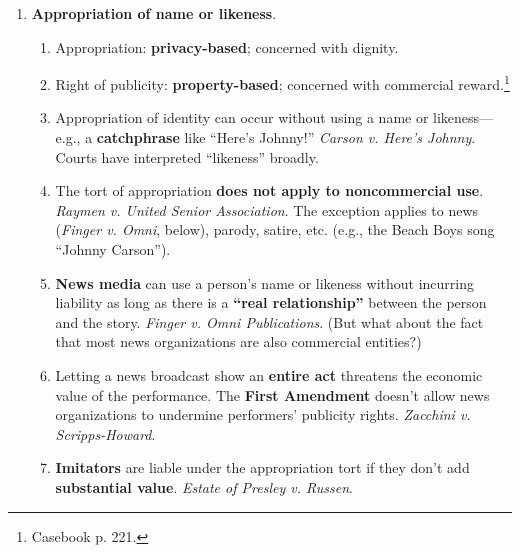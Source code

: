 \begin{enumerate}
\begin{enumerate}
        \begin{enumerate}
            \item Liability arises when ``\textbf{extreme and outrageous 
            conduct intentionally or recklessly} causes severe emotional 
            distress.''\footnote{Casebook p. 211.}
            \item To claim intentional infliction of emotional distress from 
            published material, public figures and officials must also show 
            \emph{New York Times} malice. \emph{Hustler v. Falwell}.
            \item There is \textbf{special protection} for public speech on 
            matters of \textbf{public concern}. \emph{Snyder v. Phelps} 
            (Westboro Baptist).
        \end{enumerate}
    \end{enumerate}
    \item \textbf{Appropriation of name or likeness}.
    \begin{enumerate}
        \item Appropriation: \textbf{privacy-based}; concerned with dignity.
        \item Right of publicity: \textbf{property-based}; concerned with 
        commercial reward.\footnote{Casebook p. 221.}
        \item Appropriation of identity can occur without using a name or 
        likeness---e.g., a \textbf{catchphrase} like ``Here's Johnny!'' 
        \emph{Carson v. Here's Johnny}. Courts have interpreted ``likeness'' 
        broadly.
        \item The tort of appropriation \textbf{does not apply to 
        noncommercial use}. \emph{Raymen v. United Senior Association}. The 
        exception applies to news (\emph{Finger v.  Omni}, below), parody, 
        satire, etc. (e.g., the Beach Boys song ``Johnny Carson'').
        \item \textbf{News media} can use a person's name or likeness without 
        incurring liability as long as there is a \textbf{``real 
        relationship''} between the person and the story. \emph{Finger v. Omni 
        Publications}. (But what about the fact that most news organizations 
        are also commercial entities?)
        \item Letting a news broadcast show an \textbf{entire act} threatens 
        the economic value of the performance. The \textbf{First Amendment} 
        doesn't allow news organizations to undermine performers' publicity 
        rights. \emph{Zacchini v. Scripps-Howard}.
        \item \textbf{Imitators} are liable under the appropriation tort if 
        they don't add \textbf{substantial value}. \emph{Estate of Presley v. 
        Russen}.
    \end{enumerate}
\end{enumerate}

